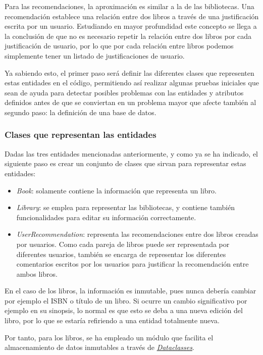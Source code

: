 Para las recomendaciones, la aproximación es similar a la de las bibliotecas. Una recomendación establece una relación entre dos libros a través de una justificación escrita por un usuario. Estudiando en mayor profundidad este concepto se llega a la conclusión de que no es necesario repetir la relación entre dos libros por cada justificación de usuario, por lo que por cada relación entre libros podemos simplemente tener un listado de justificaciones de usuario.

Ya sabiendo esto, el primer paso será definir las diferentes clases que representen estas entidades en el código, permitiendo así realizar algunas pruebas iniciales que sean de ayuda para detectar posibles problemas con las entidades y atributos definidos antes de que se conviertan en un problema mayor que afecte también al segundo paso: la definición de una base de datos.

\subsubsection{Clases que representan las entidades}

Dadas las tres entidades mencionadas anteriormente, y como ya se ha indicado, el siguiente paso es crear un conjunto de clases que sirvan para representar estas entidades:

\begin{itemize}
    \item \textit{Book}: solamente contiene la información que representa un libro.
    \item \textit{Library}: se emplea para representar las bibliotecas, y contiene también funcionalidades para editar su información correctamente.
    \item \textit{UserRecommendation}: representa las recomendaciones entre dos libros creadas por usuarios. Como cada pareja de libros puede ser representada por diferentes usuarios, también se encarga de representar los diferentes comentarios escritos por los usuarios para justificar la recomendación entre ambos libros.
\end{itemize}

En el caso de los libros, la información es inmutable, pues nunca debería cambiar por ejemplo el ISBN o título de un libro. Si ocurre un cambio significativo por ejemplo en su sinopsis, lo normal es que esto se deba a una nueva edición del libro, por lo que se estaría refiriendo a una entidad totalmente nueva.

Por tanto, para los libros, se ha empleado un módulo que facilita el almacenamiento de datos inmutables a través de \href{https://docs.python.org/3/library/dataclasses.html}{\textit{Dataclasses}}.

